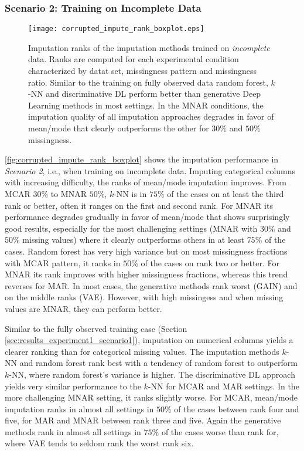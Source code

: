 \subsubsection{Scenario 2: Training on Incomplete Data}


\begin{figure}\centering
    \texttt{[image: corrupted\_impute\_rank\_boxplot.eps]}
    \caption[Imputation Ranks - Corrupted]{Imputation ranks of the  imputation methods trained on {\em incomplete} data. Ranks are computed for each experimental condition characterized by datat set, missingness pattern and missingness ratio. Similar to the training on fully observed data random forest, $k$-NN and discriminative DL perform better than generative Deep Learning methods in most settings. In the MNAR conditions, the imputation quality of all imputation approaches degrades in favor of mean/mode that clearly outperforms the other for $30\%$ and $50\%$ missingness.}
	\label{fig:corrupted_impute_rank_boxplot}
\end{figure}

\autoref{fig:corrupted_impute_rank_boxplot} shows the imputation performance in \textit{Scenario 2}, i.e., when training on incomplete data. Imputing categorical columns with increasing difficulty, the ranks of mean/mode imputation improves. From MCAR $30\%$ to MNAR $50\%$, $k$-NN is in $75\%$ of the cases on at least the third rank or better, often it ranges on the first and second rank. For MNAR its performance degrades gradually in favor of mean/mode that shows surprisingly good results, especially for the most challenging settings (MNAR with $30\%$ and $50\%$ missing values) where it clearly outperforms others in at least $75\%$ of the cases. Random forest has very high variance but on most missingness fractions with MCAR pattern, it ranks in $50\%$ of the cases on rank two or better. For MNAR its rank improves with higher missingness fractions, whereas this trend reverses for MAR. In most cases, the generative methods rank worst (GAIN) and on the middle ranks (VAE). However, with high missingess and when missing values are MNAR, they can perform better.

Similar to the fully observed training case (Section \ref{sec:results_experiment1_scenario1}), imputation on numerical columns yields a clearer ranking than for categorical missing values. The imputation methods $k$-NN and random forest rank best with a tendency of random forest to outperform $k$-NN, where random forest's variance is higher. The discriminative DL approach yields very similar performance to the $k$-NN for MCAR and MAR settings. In the more challenging MNAR setting, it ranks slightly worse. For MCAR, mean/mode imputation ranks in almost all settings in $50\%$ of the cases between rank four and five, for MAR and MNAR between rank three and five. Again the generative methods rank in almost all settings in $75\%$ of the cases worse than rank for, where VAE tends to seldom rank the worst rank six.

